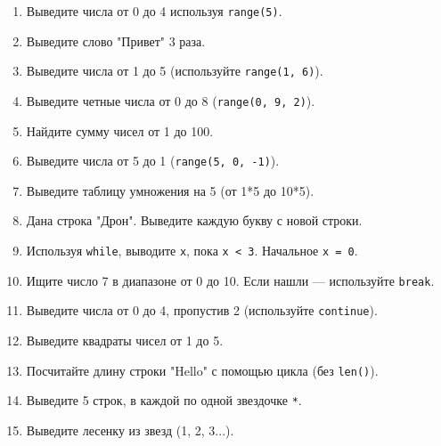 \begin{enumerate}
    \item Выведите числа от 0 до 4 используя \texttt{range(5)}.
    \item Выведите слово "Привет" 3 раза.
    \item Выведите числа от 1 до 5 (используйте \texttt{range(1, 6)}).
    \item Выведите четные числа от 0 до 8 (\texttt{range(0, 9, 2)}).
    \item Найдите сумму чисел от 1 до 100.
    \item Выведите числа от 5 до 1 (\texttt{range(5, 0, -1)}).
    \item Выведите таблицу умножения на 5 (от 1*5 до 10*5).
    \item Дана строка "Дрон". Выведите каждую букву с новой строки.
    \item Используя \texttt{while}, выводите \texttt{x}, пока \texttt{x < 3}. Начальное \texttt{x = 0}.
    \item Ищите число 7 в диапазоне от 0 до 10. Если нашли — используйте \texttt{break}.
    \item Выведите числа от 0 до 4, пропустив 2 (используйте \texttt{continue}).
    \item Выведите квадраты чисел от 1 до 5.
    \item Посчитайте длину строки "Hello" с помощью цикла (без \texttt{len()}).
    \item Выведите 5 строк, в каждой по одной звездочке \texttt{*}.
    \item Выведите лесенку из звезд (1, 2, 3...).
\end{enumerate}
